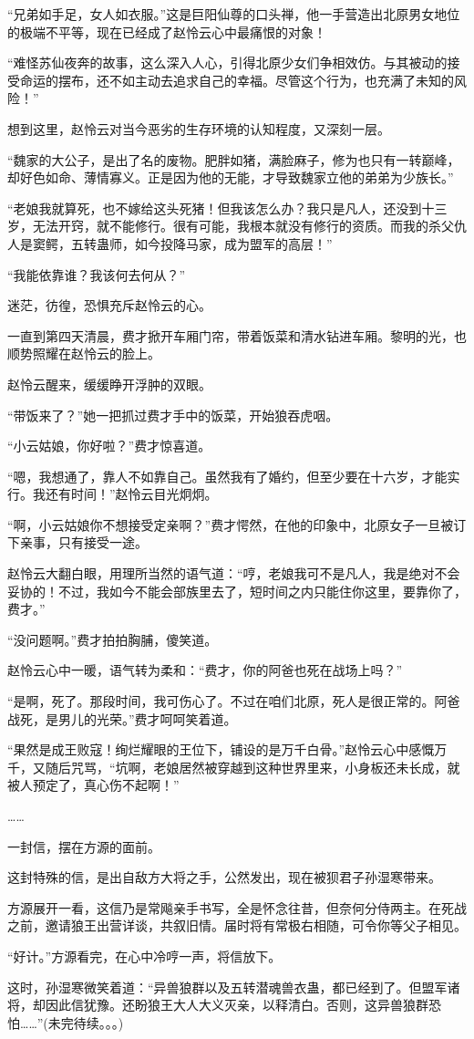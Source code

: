 \begin{this_body}
“兄弟如手足，女人如衣服。”这是巨阳仙尊的口头禅，他一手营造出北原男女地位的极端不平等，现在已经成了赵怜云心中最痛恨的对象！

“难怪苏仙夜奔的故事，这么深入人心，引得北原少女们争相效仿。与其被动的接受命运的摆布，还不如主动去追求自己的幸福。尽管这个行为，也充满了未知的风险！”

想到这里，赵怜云对当今恶劣的生存环境的认知程度，又深刻一层。

“魏家的大公子，是出了名的废物。肥胖如猪，满脸麻子，修为也只有一转巅峰，却好色如命、薄情寡义。正是因为他的无能，才导致魏家立他的弟弟为少族长。”

“老娘我就算死，也不嫁给这头死猪！但我该怎么办？我只是凡人，还没到十三岁，无法开窍，就不能修行。很有可能，我根本就没有修行的资质。而我的杀父仇人是窦鳄，五转蛊师，如今投降马家，成为盟军的高层！”

“我能依靠谁？我该何去何从？”

迷茫，彷徨，恐惧充斥赵怜云的心。

一直到第四天清晨，费才掀开车厢门帘，带着饭菜和清水钻进车厢。黎明的光，也顺势照耀在赵怜云的脸上。

赵怜云醒来，缓缓睁开浮肿的双眼。

“带饭来了？”她一把抓过费才手中的饭菜，开始狼吞虎咽。

“小云姑娘，你好啦？”费才惊喜道。

“嗯，我想通了，靠人不如靠自己。虽然我有了婚约，但至少要在十六岁，才能实行。我还有时间！”赵怜云目光炯炯。

“啊，小云姑娘你不想接受定亲啊？”费才愕然，在他的印象中，北原女子一旦被订下亲事，只有接受一途。

赵怜云大翻白眼，用理所当然的语气道：“哼，老娘我可不是凡人，我是绝对不会妥协的！不过，我如今不能会部族里去了，短时间之内只能住你这里，要靠你了，费才。”

“没问题啊。”费才拍拍胸脯，傻笑道。

赵怜云心中一暖，语气转为柔和：“费才，你的阿爸也死在战场上吗？”

“是啊，死了。那段时间，我可伤心了。不过在咱们北原，死人是很正常的。阿爸战死，是男儿的光荣。”费才呵呵笑着道。

“果然是成王败寇！绚烂耀眼的王位下，铺设的是万千白骨。”赵怜云心中感慨万千，又随后咒骂，“坑啊，老娘居然被穿越到这种世界里来，小身板还未长成，就被人预定了，真心伤不起啊！”

……

一封信，摆在方源的面前。

这封特殊的信，是出自敌方大将之手，公然发出，现在被狈君子孙湿寒带来。

方源展开一看，这信乃是常飚亲手书写，全是怀念往昔，但奈何分侍两主。在死战之前，邀请狼王出营详谈，共叙旧情。届时将有常极右相随，可令你等父子相见。

“好计。”方源看完，在心中冷哼一声，将信放下。

这时，孙湿寒微笑着道：“异兽狼群以及五转潜魂兽衣蛊，都已经到了。但盟军诸将，却因此信犹豫。还盼狼王大人大义灭亲，以释清白。否则，这异兽狼群恐怕……”(未完待续。。。)

\end{this_body}

